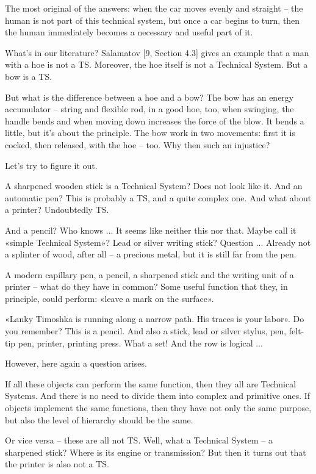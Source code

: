 \documentclass[11pt,a4paper]{article}
\begin{document}
The most original of the answers: when the car moves evenly and straight 
-- the human is not part of this technical system, but once a car begins to
turn, then the human immediately becomes a necessary and useful part of it.

What's in our literature? Salamatov [9, Section 4.3] gives an example that a
man with a hoe is not a TS. Moreover, the hoe itself is not a Technical
System.  But a bow is a TS.

But what is the difference between a hoe and a bow? The bow has an energy
accumulator -- string and flexible rod, in a good hoe, too, when swinging, the
handle bends and when moving down increases the force of the blow. It bends a
little, but it's about the principle. The bow work in two movements: first it
is cocked, then released, with the hoe -- too. Why then such an injustice?

Let's try to figure it out.

A sharpened wooden stick is a Technical System? Does not look like it. And an
automatic pen? This is probably a TS, and a quite complex one. And what about
a printer? Undoubtedly TS.

And a pencil? Who knows ... It seems like neither this nor that. Maybe call it
«simple Technical System»?  Lead or silver writing stick? Question ...
Already not a splinter of wood, after all -- a precious metal, but it is
still far from the pen.

A modern capillary pen, a pencil, a sharpened stick and the writing unit of a
printer -- what do they have in common? Some useful function that they, in
principle, could perform: «leave a mark on the surface».

«Lanky Timoshka is running along a narrow path. His traces is your labor».  Do
you remember?  This is a pencil. And also a stick, lead or silver stylus, pen,
felt-tip pen, printer, printing press. What a set! And the row is logical ...

However, here again a question arises.

If all these objects can perform the same function, then they all are
Technical Systems. And there is no need to divide them into complex and
primitive ones. If objects implement the same functions, then they have not
only the same purpose, but also the level of hierarchy should be the same.

Or vice versa -- these are all not TS. Well, what a Technical System -- a
sharpened stick? Where is its engine or transmission? But then it turns out
that the printer is also not a TS.
\end{document}
